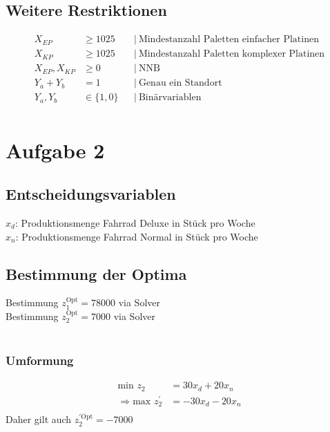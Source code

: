 \documentclass[a4paper,11pt]{article}
\begin{document}
\subsection*{Weitere Restriktionen}
\begin{align*}
X_{EP} &\ge 1025 && \big|~ \text{Mindestanzahl Paletten einfacher Platinen} \\
X_{KP} &\ge 1025 && \big|~ \text{Mindestanzahl Paletten komplexer Platinen} \\
X_{EP}, X_{KP} &\ge 0 && \big|~ \text{NNB} \\
Y_a + Y_b &= 1 && \big|~ \text{Genau ein Standort} \\
Y_a , Y_b &\in \{ 1,0 \} && \big|~ \text{Binärvariablen} \\
\end{align*}


\section*{Aufgabe 2}

\subsection*{Entscheidungsvariablen}
$x_{d}$: Produktionsmenge Fahrrad Deluxe in Stück pro Woche \\
$x_{n}$: Produktionsmenge Fahrrad Normal in Stück pro Woche \\


\subsection*{Bestimmung der Optima}
Bestimmung $z_{1}^{\text{Opt}} = 78000$ via Solver \\
Bestimmung $z_{2}^{\text{Opt}} = 7000$ via Solver \\~\\

\subsubsection*{Umformung}
\begin{align*}
\text{min } z_{2} &= 30x_{d} +20x_{n} \\
\Rightarrow \text{max } z_{2}^{'} &= -30x_{d} -20x_{n} \\
\end{align*}
Daher gilt auch $z_{2}^{'\text{Opt}} = -7000$ \\
\end{document}
